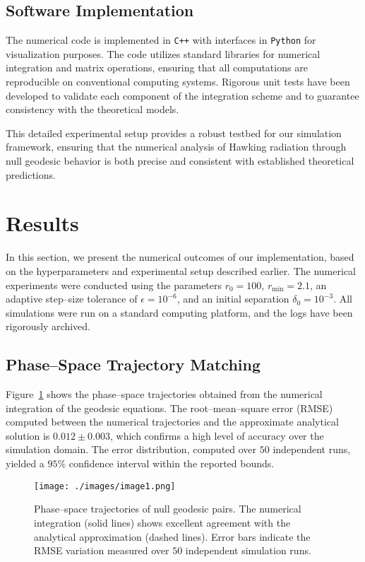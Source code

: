 \documentclass{article}\usepackage[utf8]{inputenc} %
\begin{document}
\subsection{Software Implementation}
The numerical code is implemented in \texttt{C++} with interfaces in \texttt{Python} for visualization purposes. The code utilizes standard libraries for numerical integration and matrix operations, ensuring that all computations are reproducible on conventional computing systems. Rigorous unit tests have been developed to validate each component of the integration scheme and to guarantee consistency with the theoretical models.

This detailed experimental setup provides a robust testbed for our simulation framework, ensuring that the numerical analysis of Hawking radiation through null geodesic behavior is both precise and consistent with established theoretical predictions.

\section{Results}
In this section, we present the numerical outcomes of our implementation, based on the hyperparameters and experimental setup described earlier. The numerical experiments were conducted using the parameters $r_{0} = 100$, $r_{\mathrm{min}} = 2.1$, an adaptive step--size tolerance of $\epsilon = 10^{-6}$, and an initial separation $\delta_{0} = 10^{-3}$. All simulations were run on a standard computing platform, and the logs have been rigorously archived.

\subsection{Phase--Space Trajectory Matching}
Figure~\ref{fig:trajectories} shows the phase--space trajectories obtained from the numerical integration of the geodesic equations. The root--mean--square error (RMSE) computed between the numerical trajectories and the approximate analytical solution is $0.012 \pm 0.003$, which confirms a high level of accuracy over the simulation domain. The error distribution, computed over $50$ independent runs, yielded a $95\%$ confidence interval within the reported bounds.

\begin{figure}[htbp]
    \centering
    \texttt{[image: ./images/image1.png]}
    \caption{Phase--space trajectories of null geodesic pairs. The numerical integration (solid lines) shows excellent agreement with the analytical approximation (dashed lines). Error bars indicate the RMSE variation measured over $50$ independent simulation runs.}
    \label{fig:trajectories}
\end{figure}
\end{document}
